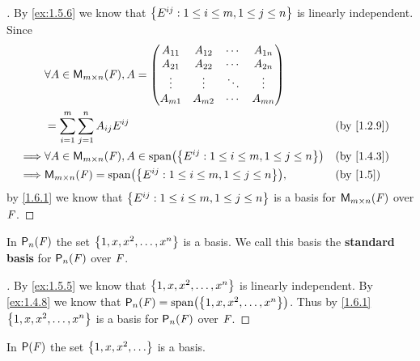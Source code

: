 \begin{proof}[]
	By \cref{ex:1.5.6} we know that \(\left\lbrace E^{i j} : 1 \leq i \leq m, 1 \leq j \leq n\right\rbrace\) is linearly independent.
	Since
	\begin{align*}
		         & \forall A \in \MS, A = \begin{pmatrix}
			                                  A_{1 1} & A_{1 2} & \cdots & A_{1 n} \\
			                                  A_{2 1} & A_{2 2} & \cdots & A_{2 n} \\
			                                  \vdots  & \vdots  & \ddots & \vdots  \\
			                                  A_{m 1} & A_{m 2} & \cdots & A_{m n}
		                                  \end{pmatrix}                                     \\
		         & = \sum_{i = 1}^m \sum_{j = 1}^n A_{i j} E^{i j}                                 &  & \by{1.2.9} \\
		\implies & \forall A \in \MS, A \in \spn{\set{E^{i j} : 1 \leq i \leq m, 1 \leq j \leq n}} &  & \by{1.4.3} \\
		\implies & \MS = \spn{\set{E^{i j} : 1 \leq i \leq m, 1 \leq j \leq n}},                   &  & \by{1.5}
	\end{align*}
	by \cref{1.6.1} we know that \(\left\lbrace E^{i j} : 1 \leq i \leq m, 1 \leq j \leq n\right\rbrace\) is a basis for \(\mathsf{M}_{{m} \times n}({\mathit{F}})\) over \(\mathit{F}\).
\end{proof}

\begin{eg}\label{1.6.5}
	In \(\ps[n]{\F}\) the set \(\left\lbrace1, x, x^2, \dots, x^n\right\rbrace\) is a basis.
	We call this basis the \textbf{standard basis} for \(\ps[n]{\F}\) over \(\mathit{F}\).
\end{eg}

\begin{proof}[]
	By \cref{ex:1.5.5} we know that \(\left\lbrace1, x, x^2, \dots, x^n\right\rbrace\) is linearly independent.
	By \cref{ex:1.4.8} we know that \(\ps[n]{\F} = \spn{\set{1, x, x^2, \dots, x^n}}\).
	Thus by \cref{1.6.1} \(\left\lbrace1, x, x^2, \dots, x^n\right\rbrace\) is a basis for \(\ps[n]{\F}\) over \(\mathit{F}\).
\end{proof}

\begin{eg}\label{1.6.6}
	In \(\ps{\F}\) the set \(\set{1, x, x^2, \dots}\) is a basis.
\end{eg}

